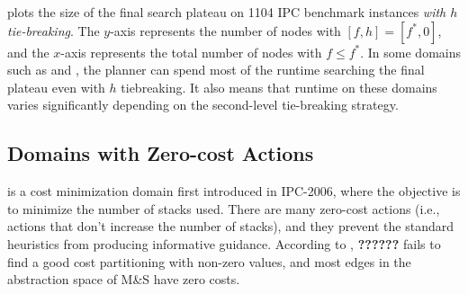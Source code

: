  plots the size of the final search plateau on 1104 IPC
benchmark instances \emph{with $h$ tie-breaking}.
The $y$-axis
represents the number of nodes with $[f,h]=[f^*,0]$, and the $x$-axis represents the total
number of nodes with $f\leq f^*$.
In some domains such as  and , the planner can spend most of the runtime
searching the final plateau even with $h$ tiebreaking.
It also
means that runtime on these domains varies significantly depending on the second-level tie-breaking strategy.




\subsection{Domains with Zero-cost Actions}

  is a cost
minimization domain first introduced in IPC-2006, where the objective is to 
minimize the number of stacks used.
There are many zero-cost actions (i.e., actions that don't increase the number of stacks), and
they prevent the standard heuristics from producing
informative guidance.
According to \cite{richter2010lama}, \textbf{??????}
\lmcut \cite{Helmert2009} fails to find a good cost
partitioning with non-zero values, 
and most edges in the abstraction
space of M\&S \cite{helmert2007flexible} have zero costs.



